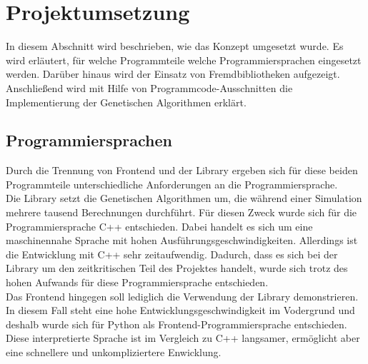 
\section{Projektumsetzung}
In diesem Abschnitt wird beschrieben, wie das Konzept umgesetzt wurde.
Es wird erläutert, für welche Programmteile welche Programmiersprachen eingesetzt werden. Darüber hinaus wird der Einsatz von Fremdbibliotheken aufgezeigt.
Anschließend wird mit Hilfe von  Programmcode-Ausschnitten die Implementierung der Genetischen Algorithmen erklärt.

\subsection{Programmiersprachen}
Durch die Trennung von Frontend und der Library ergeben sich für diese beiden Programmteile unterschiedliche Anforderungen an die Programmiersprache.\\
Die Library setzt die Genetischen Algorithmen um, die während einer Simulation mehrere tausend Berechnungen durchführt. Für diesen Zweck wurde sich für die Programmiersprache C++ entschieden.
Dabei handelt es sich um eine maschinennahe Sprache mit hohen Ausführungsgeschwindigkeiten. Allerdings ist die Entwicklung mit C++ sehr zeitaufwendig. Dadurch, dass es sich bei der Library um den zeitkritischen Teil des Projektes handelt, 
wurde sich trotz des hohen Aufwands für diese Programmiersprache entschieden.\\
Das Frontend hingegen soll lediglich die Verwendung der Library demonstrieren. In diesem Fall steht eine hohe Entwicklungsgeschwindigkeit im Vodergrund und deshalb wurde sich für Python als Frontend-Programmiersprache  entschieden. 
Diese interpretierte Sprache ist im Vergleich zu C++ langsamer, ermöglicht aber eine schnellere und unkompliziertere Enwicklung.

